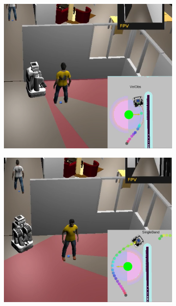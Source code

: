 \begin{figure}[h!]
\centering
\begin{subfigure}{.45\columnwidth}
  \includegraphics[width=\textwidth]{images/chapter4/door_3}
\end{subfigure}
\hspace{-0.25cm}
\begin{subfigure}{.45\columnwidth}
  \includegraphics[width=\textwidth]{images/chapter4/door_4} 

\end{subfigure}
\end{figure}
